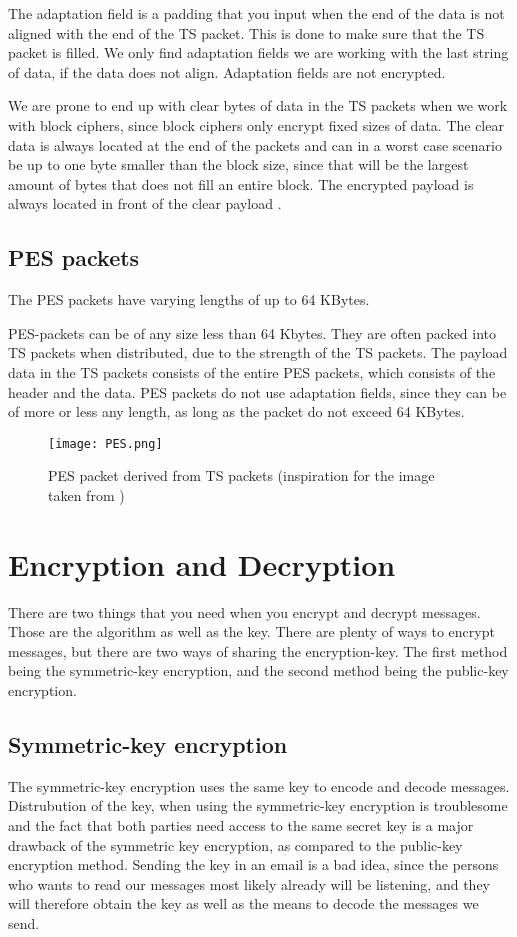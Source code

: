 The adaptation field is a padding that you input when the end of the data is not 
aligned with the end of the TS packet. This is done to make sure that the TS 
packet is filled. We only find adaptation fields we are working with the last 
string of data, if the data does not align. Adaptation fields are not encrypted.

We are prone to end up with clear bytes of data in the TS packets when we work 
with block ciphers, since block ciphers only encrypt fixed sizes of data. The 
clear data is always located at the end of the packets and can in a worst case 
scenario be up to one byte smaller than the block size, since that will be the 
largest amount of bytes that does not fill an entire block. The encrypted 
payload is always located in front of the clear payload 
\cite[pp. 10--11]{DVB:2013}.

\subsection{PES packets}
The PES packets have varying lengths of up to 64 KBytes.

PES-packets can be of any size less than 64 Kbytes. They are often packed into 
TS packets when distributed, due to the strength of the TS packets. The payload
data in the TS packets consists of the entire PES packets, which consists of the 
header and the data. PES packets do not use adaptation fields, since they can be 
of more or less any length, as long as the packet do not exceed 64 KBytes.

\begin{figure}
  \texttt{[image: PES.png]}
  \label{img:PES}
  \caption{PES packet derived from TS packets (inspiration for the image 
taken from \citep[p. 9]{ETR:289} ) }
\end{figure}

\section{Encryption and Decryption}
There are two things that you need when you encrypt and decrypt messages. Those 
are the algorithm as well as the key. There are plenty of ways to encrypt 
messages, but there are two ways of sharing the encryption-key. The first method 
being the symmetric-key encryption, and the second method being the public-key 
encryption.

\subsection{Symmetric-key encryption}
The symmetric-key encryption uses the same key to encode and decode messages. 
Distrubution of the key, when using the symmetric-key encryption is troublesome 
and the fact that both parties need access to the same secret key is a major 
drawback of the symmetric key encryption, as compared to the public-key 
encryption method. Sending the key in an email is a bad idea, since the persons 
who wants to read our messages  most likely already will be listening, and they 
will therefore obtain the key as well as the means to decode the messages we 
send.

